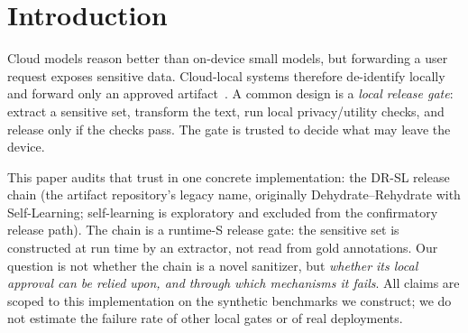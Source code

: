 \documentclass[journal]{IEEEtran}
\begin{document}
\section{Introduction}

Cloud models reason better than on-device small models, but forwarding a user request exposes sensitive data. Cloud-local systems therefore de-identify locally and forward only an approved artifact~\cite{hao2024hybrid,jin2025cecollm,li2025collab,siyan2025papillon,das2025security,lukas2023pii}. A common design is a \emph{local release gate}: extract a sensitive set, transform the text, run local privacy/utility checks, and release only if the checks pass. The gate is trusted to decide what may leave the device.

This paper audits that trust in one concrete implementation: the DR-SL release chain (the artifact repository's legacy name, originally Dehydrate--Rehydrate with Self-Learning; self-learning is exploratory and excluded from the confirmatory release path). The chain is a runtime-S release gate: the sensitive set is constructed at run time by an extractor, not read from gold annotations. Our question is not whether the chain is a novel sanitizer, but \emph{whether its local approval can be relied upon, and through which mechanisms it fails}. All claims are scoped to this implementation on the synthetic benchmarks we construct; we do not estimate the failure rate of other local gates or of real deployments.
\end{document}
